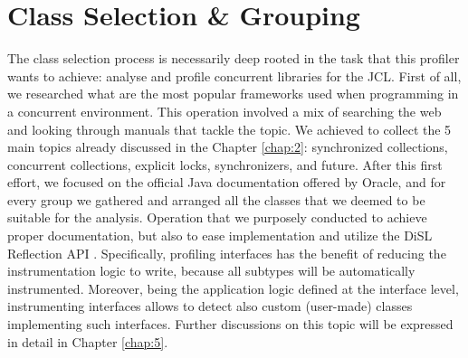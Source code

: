 \documentclass[]{usiinfthesis}
\begin{document}
\section{Class Selection \& Grouping} \label{sec:4.1}
The class selection process is necessarily deep rooted in the task that this profiler wants to achieve: analyse and profile concurrent libraries for the JCL. First of all, we researched what are the most popular frameworks used when programming in a concurrent environment. This operation involved a mix of searching the web and looking through manuals that tackle the topic. We achieved to collect the 5 main topics already discussed in the Chapter \ref{chap:2}: synchronized collections, concurrent collections, explicit locks, synchronizers, and future. After this first effort, we focused on the official Java documentation offered by Oracle, and for every group we gathered and arranged all the classes that we deemed to be suitable for the analysis. Operation that we purposely conducted to achieve proper documentation, but also to ease implementation and utilize the DiSL Reflection API \cite{DiSLReflectionAPI}. Specifically,  profiling interfaces has the benefit of reducing the instrumentation logic to write, because all subtypes will be automatically instrumented. Moreover, being the application logic defined at the interface level, instrumenting interfaces allows to detect also custom (user-made) classes implementing such interfaces. Further discussions on this topic will be expressed in detail in Chapter \ref{chap:5}.
\end{document}

